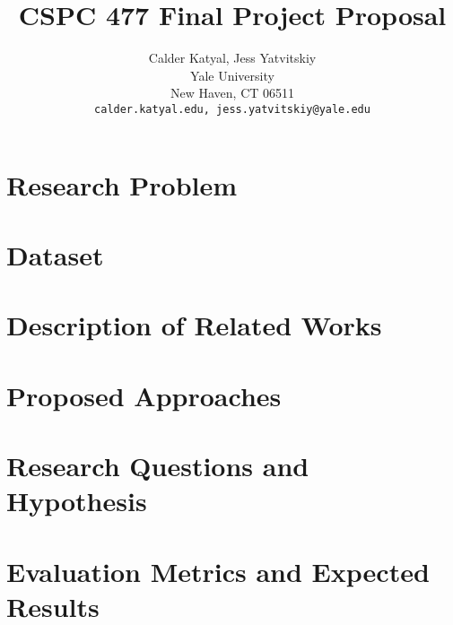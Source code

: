 \documentclass{article}
\title{CSPC 477 Final Project Proposal}
\author{%
  Calder Katyal, Jess Yatvitskiy\\
  Yale University\\
  New Haven, CT 06511 \\
  \texttt{calder.katyal.edu, jess.yatvitskiy@yale.edu} \\
}
\begin{document}
\maketitle
\section{Research Problem}
\label{research_problem}

\section{Dataset}

\section{Description of Related Works}
\label{related_works}

\section{Proposed Approaches}

\section{Research Questions and Hypothesis}

\section{Evaluation Metrics and Expected Results}
\label{metrics}

\small





\end{document}
